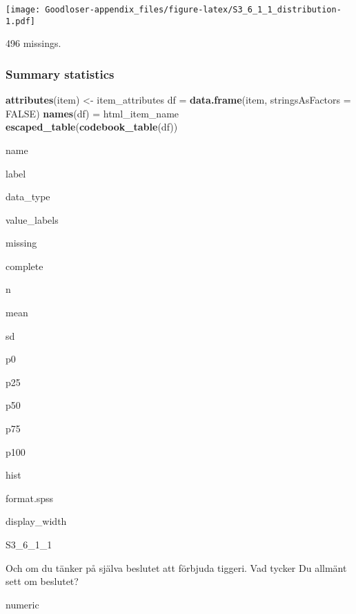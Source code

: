 \documentclass[]{book}
\newenvironment{Shaded}{\begin{snugshade}}{\end{snugshade}}
\newcommand{\KeywordTok}[1]{\textcolor[rgb]{0.13,0.29,0.53}{\textbf{#1}}}
\newcommand{\DataTypeTok}[1]{\textcolor[rgb]{0.13,0.29,0.53}{#1}}
\newcommand{\StringTok}[1]{\textcolor[rgb]{0.31,0.60,0.02}{#1}}
\newcommand{\OtherTok}[1]{\textcolor[rgb]{0.56,0.35,0.01}{#1}}
\newcommand{\OperatorTok}[1]{\textcolor[rgb]{0.81,0.36,0.00}{\textbf{#1}}}
\newcommand{\NormalTok}[1]{#1}
\begin{document}
\texttt{[image: Goodloser-appendix\_files/figure-latex/S3\_6\_1\_1\_distribution-1.pdf]}

\begin{Shaded}
\end{Shaded}

496 missings.

\subsubsection{Summary statistics}\label{S3_6_1_1_summary}

\begin{Shaded}
\begin{Highlighting}[]
\KeywordTok{attributes}\NormalTok{(item) <-}\StringTok{ }\NormalTok{item_attributes}
\NormalTok{df =}\StringTok{ }\KeywordTok{data.frame}\NormalTok{(item, }\DataTypeTok{stringsAsFactors =} \OtherTok{FALSE}\NormalTok{)}
\KeywordTok{names}\NormalTok{(df) =}\StringTok{ }\NormalTok{html_item_name}
\KeywordTok{escaped_table}\NormalTok{(}\KeywordTok{codebook_table}\NormalTok{(df))}
\end{Highlighting}
\end{Shaded}

name

label

data\_type

value\_labels

missing

complete

n

mean

sd

p0

p25

p50

p75

p100

hist

format.spss

display\_width

S3\_6\_1\_1

Och om du tänker på själva beslutet att förbjuda tiggeri. Vad tycker Du
allmänt sett om beslutet?

numeric
\end{document}
